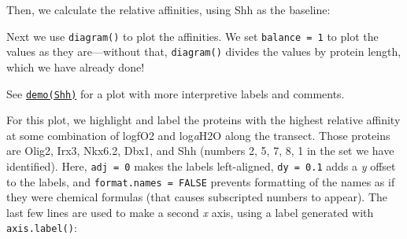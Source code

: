 \documentclass[]{tufte-book}
\newenvironment{Shaded}{}{}
\newcommand{\KeywordTok}[1]{\textcolor[rgb]{0.00,0.44,0.13}{\textbf{#1}}}
\newcommand{\DecValTok}[1]{\textcolor[rgb]{0.25,0.63,0.44}{#1}}
\newcommand{\StringTok}[1]{\textcolor[rgb]{0.25,0.44,0.63}{#1}}
\newcommand{\ControlFlowTok}[1]{\textcolor[rgb]{0.00,0.44,0.13}{\textbf{#1}}}
\newcommand{\OperatorTok}[1]{\textcolor[rgb]{0.40,0.40,0.40}{#1}}
\newcommand{\NormalTok}[1]{#1}
\begin{document}
\begin{Shaded}
\end{Shaded}

Then, we calculate the relative affinities, using Shh as the baseline:

\begin{Shaded}
\end{Shaded}

Next we use {\texttt{diagram()}} to plot the affinities. We set
\texttt{balance\ =\ 1} to plot the values as they are---without that,
{\texttt{diagram()}} divides the values by protein length, which we have
already done!

\begin{marginfigure}
See \href{../demo}{{\texttt{demo(Shh)}}} for a plot with more
interpretive labels and comments.
\end{marginfigure}

For this plot, we highlight and label the proteins with the highest
relative affinity at some combination of logfO2 and log\emph{a}H2O along
the transect. Those proteins are Olig2, Irx3, Nkx6.2, Dbx1, and Shh
(numbers 2, 5, 7, 8, 1 in the set we have identified). Here,
\texttt{adj\ =\ 0} makes the labels left-aligned, \texttt{dy\ =\ 0.1}
adds a \emph{y} offset to the labels, and
\texttt{format.names\ =\ FALSE} prevents formatting of the names as if
they were chemical formulas (that causes subscripted numbers to appear).
The last few lines are used to make a second \emph{x} axis, using a
label generated with {\texttt{axis.label()}}:
\end{document}
